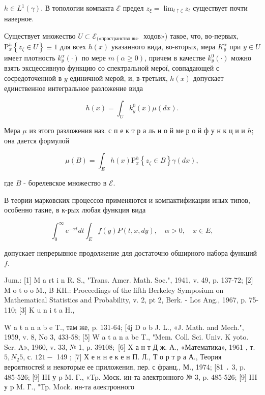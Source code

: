 \documentclass[10pt]{article}
\begin{document}
$h \in L^{1}(\gamma)$. В топологии компакта $\mathscr{E}$ предел $z_{\xi}=\lim _{t \uparrow \zeta} z_{t}$ существует почти наверное.



Существует множество $U \subset \mathscr{E}_{\text {(«пространство вы- }}$ ходов») такое, что, во-первых, $\mathrm{P}_{x}^{h}\left\{z_{\zeta} \in U\right\} \equiv 1$ для всех $h(x)$ указанного вида, во-вторых, мера $K_{y}^{\alpha}$ при $y \in U$ имеет плотность $k_{y}^{\alpha}(\cdot)$ по мере $m(\alpha \geqslant 0)$, причем в качестве $k_{y}^{0}(\cdot)$ можно взять эксцессивную функцию со спектральной мерої, совпадающей с сосредоточенной в $y$ единичной мерой, и, в-третьих, $h(x)$ допускает единственное интегральное разложение вида



\[

h(x)=\int_{U} k_{y}^{0}(x) \mu(d x) .

\]



Мера $\mu$ из этого разложения наз. с п е к т р а ль н о й ме р о й ф у н к ц и и $h$; она дается формулой



\[

\mu(B)=\int_{E} h(x) \mathrm{P}_{x}^{h}\left\{z_{\zeta} \in B\right\} \gamma(d x),

\]



где $B$ - борелевское множество в $\mathscr{E}$.



В теории марковских процессов применяются и компактификации иных типов, особенно такие, в к-рых любая функция вида



\[

\int_{0}^{\infty} e^{-\alpha t} d t \int_{E} f(y) P(t, x, d y), \quad \alpha>0, \quad x \in E,

\]



допускает непрерывное продолжение для достаточно обширного набора функций $f$.



Jum.: [1] M a rt i n R. S., "Trans. Amer. Math. Soc.", 1941, v. 49, p. 137-72; [2] M o t o o M., B KH.: Proceedings of the fifth Berkeley Symposium on Mathematical Statistics and Probability, v. 2, pt 2, Berk. - Los Ang., 1967, p. 75-110; [3] K u n i t a H.,

W a t a n a b e T., там же, p. 131-64; [4j D o b J. L., «J. Math. and Mech.", 1959, v. 8, No 3, 433-58; [5] W a t a n a be T., "Mem. Coll. Sci. Univ. K yoto. Ser. A», 1960, v. 33, № 1, p. 39$108 ;$ [6] X а н т Д ж. А., «Математика», 1961 , т. $5, N_{2} 5$, с. $121-$ 149 ; [7] Х е н н е к е н П. Л., Т о р т р а А., Теория вероятностей и некоторые ее приложения, пер. с франц., М., 1974; [81 ․ 3, p. 485-526; [9] III у p M. Г., «Tp. Моск. ин-та әлектронного № 3, p. 485-526; [9] III у p M. Г., "Tp. Mock. ин-та әлектронного
\end{document}
